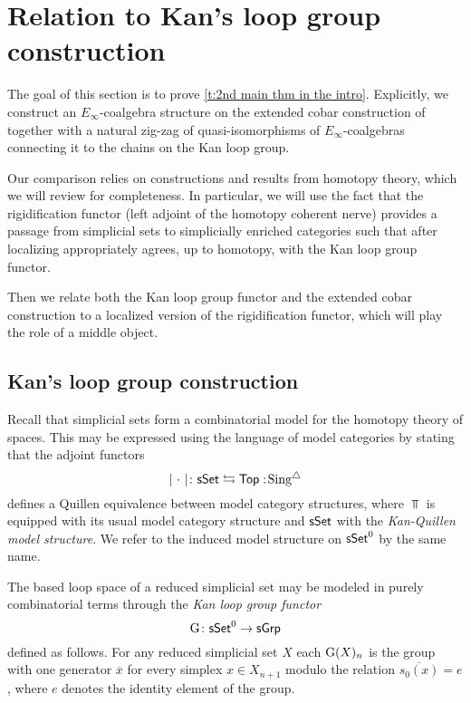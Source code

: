 
\section{Relation to Kan's loop group construction}

The goal of this section is to prove \cref{t:2nd main thm in the intro}.
Explicitly, we construct an $E_{\infty}$-coalgebra structure on the extended cobar construction of \cite{hess2010cobar} together with a natural zig-zag of quasi-isomorphisms of $E_{\infty}$-coalgebras connecting it to the chains on the Kan loop group. 

Our comparison relies on constructions and results from homotopy theory, which we will review for completeness. In particular, we will use the fact that the rigidification functor (left adjoint of the homotopy coherent nerve) provides a passage from simplicial sets to simplicially enriched categories such that after localizing appropriately agrees, up to homotopy, with the Kan loop group functor.


Then we relate both the Kan loop group functor and the extended cobar construction to a localized version of the rigidification functor, which will play the role of a middle object. 

\subsection{Kan's loop group construction}

Recall that simplicial sets form a combinatorial model for the homotopy theory of spaces.
This may be expressed using the language of model categories by stating that the adjoint functors
\begin{equation*}
\vert{\ \cdot\ }\vert \colon \mathsf{sSet} \leftrightarrows \mathsf{Top} :\! \operatorname{Sing^{\triangle}}
\end{equation*}
defines a Quillen equivalence between model category structures, where $\Top$ is equipped with its usual model category structure and $\mathsf{sSet}$ with the \textit{Kan-Quillen model structure}.
We refer to the induced model structure on $\mathsf{sSet}^0$ by the same name.

The based loop space of a reduced simplicial set may be modeled in purely combinatorial terms through the \textit{Kan loop group functor} 
\begin{equation*}
\operatorname{G} \colon \mathsf{sSet}^0 \to \mathsf{sGrp}
\end{equation*}
defined as follows.
For any reduced simplicial set $X$ each $\operatorname{G}(X)_n$ is the group with one generator $\overline{x}$ for every simplex $x \in X_{n+1}$ modulo the relation $\overline{s_0(x)} = e$, where $e$ denotes the identity element of the group.  

